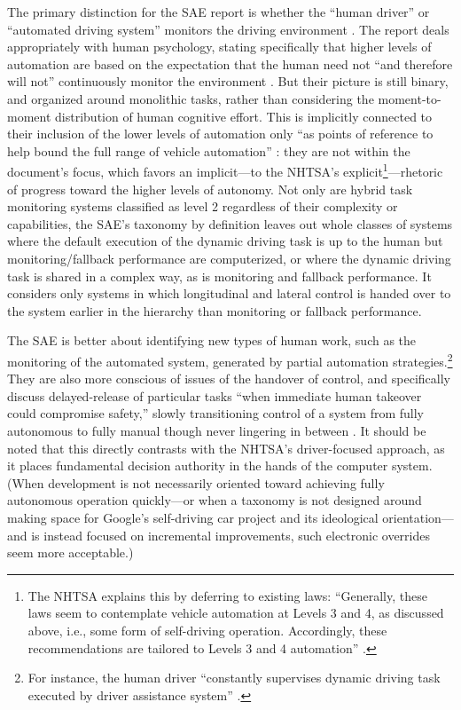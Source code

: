 The primary distinction for the SAE report is whether the ``human driver'' or ``automated
driving system'' monitors the driving environment \cite[p. 5]{SAE}. The report deals
appropriately with human psychology, stating specifically that higher
levels of automation are based on the expectation that the human need
not ``and therefore will not'' continuously
monitor the environment \cite[p. 9]{SAE}. But their 
picture is still binary, and organized around monolithic tasks, rather
than considering the moment-to-moment 
distribution of human 
cognitive effort. This is implicitly connected to their inclusion of
the lower levels of automation only ``as points of reference to help
bound the full range of vehicle automation'' \cite[p. 2]{SAE}: they are not within
the document's focus, which favors an implicit---to the NHTSA's
explicit\footnote{The NHTSA explains this by deferring to existing
  laws: ``Generally, these laws seem to contemplate vehicle 
automation at Levels 3 and 4, as discussed above, i.e., some form of
self-driving operation. 
Accordingly, these recommendations are tailored to Levels 3 and 4
automation'' \cite[p. 10]{NHTSA}.}---rhetoric of progress toward the
higher levels of autonomy. 
Not only are hybrid task monitoring systems classified as level 2
regardless of their complexity or capabilities, the SAE's taxonomy by
definition leaves out whole classes of systems where the default
execution of the dynamic driving task is up to the human but
monitoring/fallback performance are computerized, or where the dynamic
driving task is shared in a complex way, as is monitoring and fallback
performance. It considers only systems in which longitudinal and
lateral control is handed over to the system earlier in the hierarchy
than monitoring or fallback performance.

The SAE is better about
identifying new types of human work, such as the monitoring of the
automated system, generated by partial automation
strategies.\footnote{For instance, the human driver ``constantly
  supervises dynamic driving task executed by driver assistance
  system'' \cite[p. 3]{SAE}.} They
are also more conscious of issues of the handover of control, and
specifically discuss delayed-release of particular tasks ``when
immediate human takeover could compromise safety,'' slowly
transitioning control of a system from fully autonomous to fully
manual though never lingering in between \cite[p. 4]{SAE}. It should be
noted that this directly contrasts with the NHTSA's driver-focused
approach, as it places fundamental decision authority in the hands of
the computer system. (When development is not necessarily oriented
toward achieving fully autonomous operation quickly---or when a
taxonomy is not designed around making space for Google's self-driving
car project and its ideological orientation---and is instead
focused on incremental improvements, such electronic overrides seem more acceptable.)

